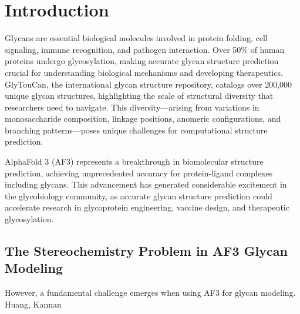 \documentclass[11pt,a4paper]{article}
\begin{document}
\section{Introduction}

Glycans are essential biological molecules involved in protein folding, cell signaling, immune recognition, and pathogen interaction. Over 50\% of human proteins undergo glycosylation, making accurate glycan structure prediction crucial for understanding biological mechanisms and developing therapeutics. GlyTouCan, the international glycan structure repository, catalogs over 200,000 unique glycan structures, highlighting the scale of structural diversity that researchers need to navigate. This diversity---arising from variations in monosaccharide composition, linkage positions, anomeric configurations, and branching patterns---poses unique challenges for computational structure prediction.

AlphaFold 3 (AF3) represents a breakthrough in biomolecular structure prediction, achieving unprecedented accuracy for protein-ligand complexes including glycans. This advancement has generated considerable excitement in the glycobiology community, as accurate glycan structure prediction could accelerate research in glycoprotein engineering, vaccine design, and therapeutic glycosylation.

\subsection{The Stereochemistry Problem in AF3 Glycan Modeling}

However, a fundamental challenge emerges when using AF3 for glycan modeling. Huang, Kannan
\end{document}
